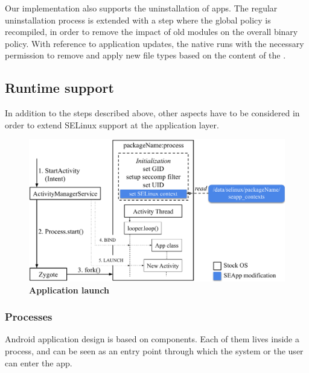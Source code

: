 Our implementation also supports the uninstallation of \pap apps.  The
regular uninstallation process is extended with a step where the
global policy is recompiled, in order to remove the impact of old
modules on the overall binary policy.  With reference to application
updates, the native \installd runs with the necessary permission to
remove and apply new file types based on the content of the
\filecontexts.

\subsection{Runtime support}\label{sect:seapp_app_runtime}

In addition to the steps described above, other aspects have to be
considered in order to extend SELinux support at the application
layer.

\begin{figure}[h]
  \centering
  \includegraphics[width=0.8\columnwidth]{chapters/seapp/figs/app_launch}
  \caption{\label{fig:seapp_runtime} \bf Application launch}
\end{figure}

\subsubsection{Processes}

Android application design is based on components.  Each of them lives
inside a process, and can be seen as an entry point through which the
system or the user can enter the app.

